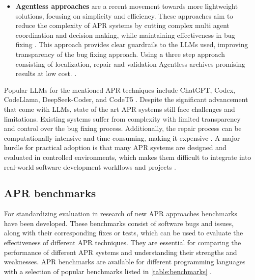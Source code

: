 \begin{itemize}
    \item \textbf{Agentless approaches} are a recent movement towards more lightweight solutions, focusing on simplicity and efficiency. These approaches aim to reduce the complexity of APR systems by cutting complex multi agent coordination and decision making, while maintaining effectiveness in bug fixing \cite{xiaAgentlessDemystifyingLLMbased2024,puvvadiCodingAgentsComprehensive2025}. This approach provides clear guardrails to the LLMs used, improving transparency of the bug fixing approach. Using a three step approach consisting of localization, repair and validation Agentless \cite{xiaAgentlessDemystifyingLLMbased2024} archives promising results at low cost. \cite{xiaAgentlessDemystifyingLLMbased2024, mengEmpiricalStudyLLMbased2024}.
\end{itemize}

Popular LLMs for the mentioned APR techniques include ChatGPT, Codex, CodeLlama, DeepSeek-Coder, and CodeT5 \cite{houLargeLanguageModels2024, yinThinkRepairSelfDirectedAutomated2024,anandComprehensiveSurveyAIDriven2024}.
Despite the significant advancement that come with LLMs, state of the art APR systems still face challenges and limitations. Existing systems suffer from complexity with limited transparency and control over the bug fixing process\cite{xiaAgentlessDemystifyingLLMbased2024,puvvadiCodingAgentsComprehensive2025, houLargeLanguageModels2024}. Additionally, the repair process can be computationally intensive and time-consuming, making it expensive \cite{sobaniaAnalysisAutomaticBug2023, puvvadiCodingAgentsComprehensive2025}. A major hurdle for practical adoption is that many APR systems are designed and evaluated in controlled environments, which makes them difficult to integrate into real-world software development workflows and projects \cite{meemExploringExperiencesAutomated2024,puvvadiCodingAgentsComprehensive2025}.

\subsection{APR benchmarks}

For standardizing evaluation in research of new APR approaches benchmarks have been developed. These benchmarks consist of software bugs and issues, along with their corresponding fixes or tests, which can be used to evaluate the effectiveness of different APR techniques. \cite{anandComprehensiveSurveyAIDriven2024} They are essential for comparing the performance of different APR systems and understanding their strengths and weaknesses. \cite{puvvadiCodingAgentsComprehensive2025} APR benchmarks are available for different programming languages with a selection of popular benchmarks listed in \ref{table:benchmarks} \cite{wangSoftwareDevelopmentLife2025}.

